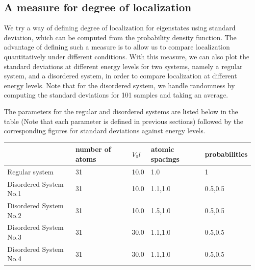 \subsection{A measure for degree of localization}
We try a way of defining degree of localization for eigenstates using standard deviation, which can be computed from the probability density function.
The advantage of defining such a measure is to allow us to compare localization quantitatively under different conditions. With this measure, we can also plot the standard deviations at different energy levels for two systems, namely a regular system, and a disordered system, in order to compare localization at different energy levels. 
Note that for the disordered system, we handle randomness by computing the standard deviations for 101 samples and taking an average.

The parameters for the regular and disordered systems are listed below in the table (Note that each parameter is defined in previous sections) followed by the corresponding figures for standard deviations against energy levels. 


\newpage
\begin{table}[]
\centering
\begin{tabular}{|l|l|l|l|l|}
\hline
	 & number of atoms  &$V_0l$& atomic spacings & probabilities   \\ \hline
Regular system&31& 10.0  & {1.0}  & {1} \\ \hline
Disordered System No.1 &31 &10.0   & {1.1,1.0}  & {0.5,0.5}    \\ \hline
Disordered System No.2 &31 &10.0   & {1.5,1.0}  & {0.5,0.5}    \\ \hline
Disordered System No.3 &31 &30.0   & {1.1,1.0}  & {0.5,0.5}    \\ \hline
Disordered System No.4 &31 &30.0   & {1.1,1.0}  & {0.5,0.5}    \\ \hline
\end{tabular}
\centering
\end{table}



